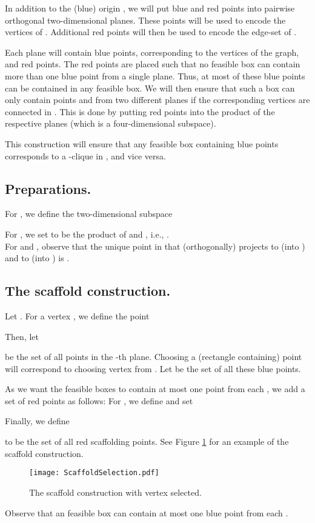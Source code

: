 \documentclass[12pt]{article}
\begin{document}
In addition to the (blue) origin , we will put blue and red points into
 pairwise orthogonal two-dimensional planes. These points will be used to
encode the vertices of . Additional red points will then be used to encode the
edge-set of .

Each plane will contain  blue points, corresponding to the vertices of
the graph, and  red points. The red points are placed such that no feasible box can contain more than one blue
point from a single plane. Thus, at most  of these blue points can be
contained in any feasible box. We will then ensure that
such a box can only contain points  and  from two
different planes if the corresponding vertices are connected in . This
is done by putting red points into the product of the respective
planes (which is a four-dimensional subspace). 

This construction will ensure that any feasible box containing  blue points corresponds to a 
-clique in , and vice versa.

\subsection{Preparations.}
For , we define the two-dimensional subspace

For , we set  to be the product of  and , i.e., .\\
For  and , observe that the unique
point in  that (orthogonally) projects to  (into )
and to  (into ) is .

\subsection{The scaffold construction.}
Let . For a vertex , we define the point
  
Then, let

be the set of all points in the -th plane.
Choosing a (rectangle containing) point  will correspond to
choosing vertex  from . 
Let  be the set of all these blue points.

As we want the feasible boxes to contain at most one point from
each , we add a set of red points as follows: For , we define  and set

Finally, we define

to be the set of all red scaffolding points. See Figure \ref{fig:ScaffoldSelection} for an example of the scaffold construction.
\begin{figure}
	\centering
		\texttt{[image: ScaffoldSelection.pdf]}
	\caption{The scaffold construction with vertex  selected.}
	\label{fig:ScaffoldSelection}
\end{figure}
Observe that an feasible box  can contain at most one blue point from each .
\end{document}
